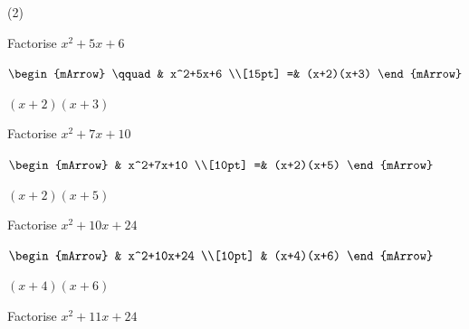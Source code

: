 \begin{mtask}[resume](2)
   \task \begin{exercise} Factorise $x^2+5x+6$\\
            \begin{envSolution}[equal height group=hRevF1]
                  $\begin{mArrow}
                       \qquad  & x^2+5x+6 \\[15pt]
	                          =& (x+2)(x+3)
					\end{mArrow}$
                 \begin{shortsolution}  
				       $(x+2)(x+3)$
			     \end{shortsolution}				 
               \end{envSolution}
         \end{exercise}

   \task \begin{exercise} Factorise $x^2+7x+10$\\
             \begin{envSolution}
			      $\begin{mArrow}
			             &  x^2+7x+10                        \\[10pt]    
						=& (x+2)(x+5)
				 \end{mArrow}$
                 \begin{shortsolution}  
				       $(x+2)(x+5)$
			     \end{shortsolution}				 
               \end{envSolution}
         \end{exercise}

   \task \begin{exercise} Factorise $x^2+10x+24$\\
             \begin{envSolution}
			      
			      $\begin{mArrow}
			           & x^2+10x+24                      \\[10pt]  
                       & (x+4)(x+6)					   
				 \end{mArrow}$
                 \begin{shortsolution}  
				       $(x+4)(x+6)$
			     \end{shortsolution}				 
               \end{envSolution}
         \end{exercise}

   \task \begin{exercise} Factorise $x^2+11x+24$\\
             \begin{envSolution}
			      

\end{envSolution}
\end{exercise}
\end{mtask}

